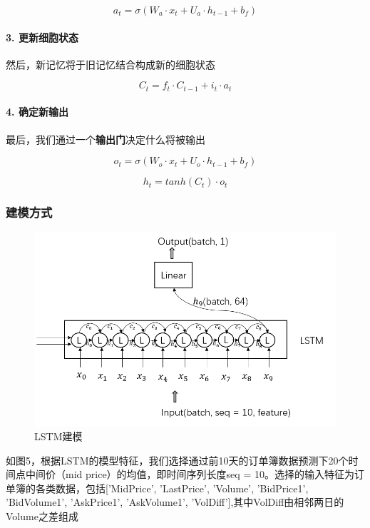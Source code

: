 \documentclass[UTF8]{ctexart}
\begin{document}
\begin{equation}\label{at}
a_t  = \sigma (W_a\cdot x_t + U_a\cdot h_{t-1} + b_f)
\end{equation}

\paragraph*{3. 更新细胞状态}
然后，新记忆将于旧记忆结合构成新的细胞状态

\begin{equation}\label{ct}
C_t = f_t\cdot C_{t-1} + i_t \cdot a_t
\end{equation}

\paragraph*{4. 确定新输出}
最后，我们通过一个\textbf{输出门}决定什么将被输出

\begin{equation}\label{ot}
o_t = \sigma(W_o\cdot x_t + U_o\cdot h_{t-1} + b_f)
\end{equation}

\begin{equation}\label{ht}
h_t = tanh(C_t)\cdot o_t
\end{equation}
\subsubsection{建模方式}
\begin{figure}[!htbp]
    \centering
    \includegraphics[scale = 0.6]{p6.png}
    \caption{LSTM建模\cite{2}}
\end{figure}
如图5，根据LSTM的模型特征，我们选择通过前10天的订单簿数据预测下20个时间点中间价（mid price）的均值，即时间序列长度seq = 10。选择的输入特征为订单簿的各类数据，包括['MidPrice', 'LastPrice', 'Volume', 'BidPrice1', 'BidVolume1', 'AskPrice1', 'AskVolume1', 'VolDiff'],其中VolDiff由相邻两日的Volume之差组成
\end{document}
